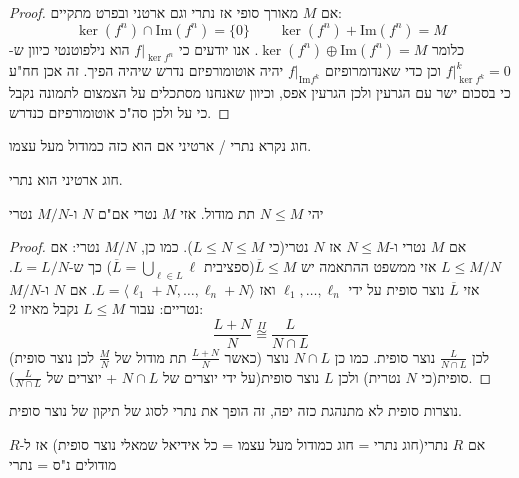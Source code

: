 \documentclass{tstextbook}
\begin{document}
\begin{proof}
אם \(M\) מאורך סופי אז נתרי וגם ארטני ובפרט מתקיים:
$$\ker (f^{n})\cap \mathrm{\mathrm{Im}}(f^{n})=\{ 0 \}\qquad \ker (f^{n})+\mathrm{Im}(f^{n})=M$$
כלומר \(\ker (f^{n})\oplus \mathrm{\mathrm{Im}}(f^{n})=M\). 
אנו יודעים כי \(f|_{\ker f^{n}}\) הוא נילפוטנטי כיוון ש-\(f|_{\ker f^{k}}^{k}=0\) וכן כדי שאנדומרופיזם \(f|_{\mathrm{Im}f^{k}}\) יהיה אוטומורפיזם נדרש שיהיה הפיך. זה אכן חח"ע כי בסכום ישר עם הגרעין ולכן הגרעין אפס, וכיוון שאנחנו מסתכלים על הצמצום לתמונה נקבל כי על ולכן סה"כ אוטומורפיזם כנדרש.

\end{proof}
\begin{definition}
חוג נקרא נתרי / ארטיני אם הוא כזה כמודול מעל עצמו.

\end{definition}
\begin{theorem}
חוג ארטיני הוא נתרי.

\end{theorem}
\begin{proposition}
יהי \(N\leq M\) תת מודול. אזי \(M\) נטרי אם"ם \(N\) ו-\(M / N\) נטרי

\end{proposition}
\begin{proof}
אם \(M\) נטרי ו-\(N\leq M\) אז \(N\) נטרי(כי \(L\leq N \leq M\)). כמו כן, \(M / N\) נטרי:
אם \(L\leq M / N\) אזי ממשפט ההתאמה יש \(\overline{L}\leq M\)(ספציבית \(\overline{L}=\bigcup_{\ell \in L}\ell\)) כך ש-\(L = L / N\). אזי \(\overline{L}\) נוצר סופית על ידי \(\ell_{1},\dots,\ell_{n}\) ואז \(L=\langle \ell_{1}+N, \dots,\ell_{n}+N \rangle\).
אם \(N\) ו-\(M / N\) נטריים:
עבור \(L\leq M\) נקבל מאיזו 2:
$$\frac{L+N}{N}\overset{II}{\cong } \frac{L}{N\cap  L}$$
(כאשר \(\frac{L+N}{N}\) תת מודול של \(\frac{M}{ N}\) לכן נוצר סופית) לכן \(\frac{L}{N \cap L}\) נוצר סופית. כמו כן \(N\cap L\) נוצר סופית(כי \(N\) נטרית) ולכן \(L\) נוצר סופית(על ידי יוצרים של \(N\cap L\) + יוצרים של \(\frac{L}{N\cap L}\)).

\end{proof}
\begin{remark}
נוצרות סופית לא מתנהגת כזה יפה, זה הופך את נתרי לסוג של תיקון של נוצר סופית.

\end{remark}
\begin{corollary}
אם \(R\) נתרי(חוג נתרי = חוג כמודול מעל עצמו = כל אידיאל שמאלי נוצר סופית) אז ל-\(R\) מודולים נ"ס = נתרי

\end{corollary}
\end{document}
